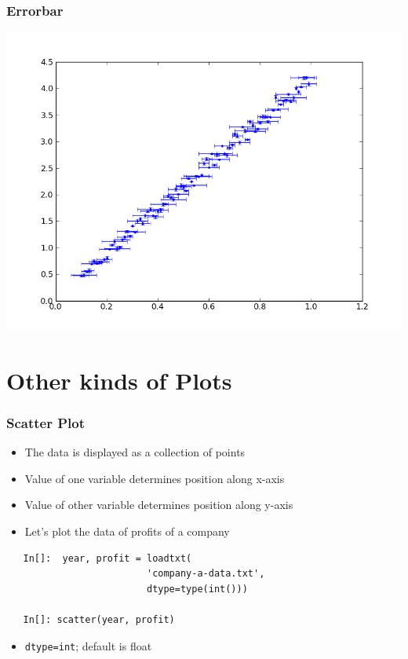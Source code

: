 \begin{frame}
\frametitle{Errorbar}
\includegraphics[scale=0.45]{../advanced_python/images/L-Tsq.png}\\
\end{frame}

\section{Other kinds of Plots}

\begin{frame}[fragile]
  \frametitle{Scatter Plot}
  \begin{itemize}
  \item The data is displayed as a collection of points
  \item Value of one variable determines position along x-axis
  \item Value of other variable determines position along y-axis
  \item Let's plot the data of profits of a company
  \end{itemize}
  \begin{lstlisting}
   In[]:  year, profit = loadtxt(
                         'company-a-data.txt', 
                         dtype=type(int()))

   In[]: scatter(year, profit)
  \end{lstlisting}
  \begin{itemize}
  \item \alert{\texttt{dtype=int}; default is float} 
  \end{itemize}
\end{frame}

